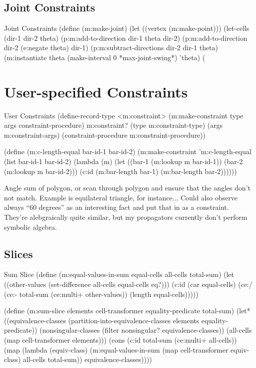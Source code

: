 \subsection{Joint Constraints}
\begin{code-listing}
{Joint Constraints}
(define (m:make-joint)
  (let ((vertex (m:make-point)))
    (let-cells (dir-1 dir-2 theta)
      (p:m:add-to-direction dir-1 theta dir-2)
      (p:m:add-to-direction dir-2 (e:negate theta) dir-1)
      (p:m:subtract-directions dir-2 dir-1 theta)
      (m:instantiate theta (make-interval 0 *max-joint-swing*) 'theta)
      (%
\end{code-listing}

\section{User-specified Constraints}

\begin{code-listing}{User Constraints}
(define-record-type <m:constraint>
  (m:make-constraint type args constraint-procedure)
  m:constraint?
  (type m:constraint-type)
  (args m:constraint-args)
  (constraint-procedure m:constraint-procedure))

(define (m:c-length-equal bar-id-1 bar-id-2)
  (m:make-constraint
   'm:c-length-equal
   (list bar-id-1 bar-id-2)
   (lambda (m)
     (let ((bar-1 (m:lookup m bar-id-1))
           (bar-2 (m:lookup m bar-id-2)))
       (c:id (m:bar-length bar-1)
             (m:bar-length bar-2))))))
\end{code-listing}

Angle sum of polygon, or scan through polygon and ensure that the
angles don't not match. Example is equilateral triangle, for
instance... Could also observe always ``60 degrees'' as an interesting
fact and put that in as a constraint. They're alebgraically quite
similar, but my propagators currently don't perform symbolic algebra.

\subsection{Slices}

\begin{code-listing}
[label=sum-slice]
{Sum Slice}
(define (m:equal-values-in-sum equal-cells all-cells total-sum)
  (let ((other-values (set-difference all-cells equal-cells eq?)))
    (c:id (car equal-cells)
          (ce:/ (ce:- total-sum (ce:multi+ other-values))
                (length equal-cells)))))

(define (m:sum-slice elements cell-transformer equality-predicate total-sum)
  (let* ((equivalence-classes
          (partition-into-equivalence-classes elements equality-predicate))
         (nonsingular-classes (filter nonsingular? equivalence-classes))
         (all-cells (map cell-transformer elements)))
    (cons (c:id total-sum (ce:multi+ all-cells))
          (map (lambda (equiv-class)
                 (m:equal-values-in-sum
                  (map cell-transformer equiv-class) all-cells total-sum))
               equivalence-classes))))
\end{code-listing}

